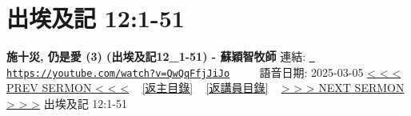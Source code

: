 \documentclass{book}
\begin{document}
\section{出埃及記 12:1-51}
\label{sec:QwQqFfjJiJo}
\textbf{施十災, 仍是愛 (3) (出埃及記12\_1-51) -  蘇穎智牧師}
\newline
\newline
連結: \href{https://youtube.com/watch?v=QwQqFfjJiJo}{\texttt{ https://youtube.com/watch?v=QwQqFfjJiJo}} ~~~~ 語音日期: 2025-03-05 
\newline
\newline
\hyperref[sec:8LlYAk0Xlok]{< < < PREV SERMON < < <}
~
\hyperlink{toc}{[返主目錄]}
~
\hyperref[ch:preacher8]{[返講員目錄]}
~
\hyperref[sec:AIPkez5NCbg]{> > > NEXT SERMON > > >}
\newline
\newline
出埃及記 12:1-51
\newline
\end{document}

